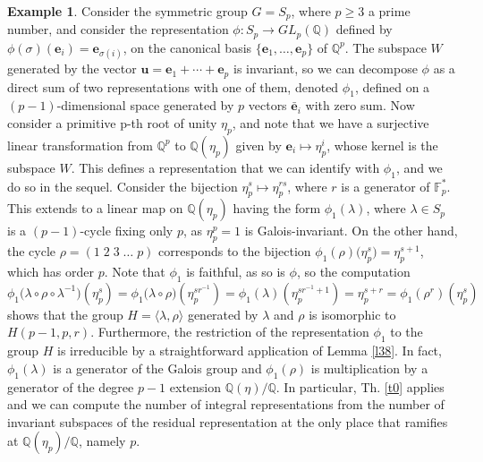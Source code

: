 \documentclass{article}
\theoremstyle{definition}
\newtheorem{ex}[prop]{Example}
\begin{document}
\begin{ex}\label{ex55}
    Consider the symmetric group $G=S_p$, where $p\geq3$ a prime number, 
    and consider the representation $\phi:S_p\rightarrow GL_p(\mathbb{Q})$
    defined by $\phi(\sigma)(\mathbf{e}_i)=\mathbf{e}_{\sigma(i)}$, on 
    the canonical basis $\{\mathbf{e}_1,\dots,\mathbf{e}_p\}$ of 
    $\mathbb{Q}^p$. The subspace $W$ generated by the vector 
    $\mathbf{u}=\mathbf{e}_1+\cdots +\mathbf{e}_p$ is invariant, so we can 
    decompose $\phi$ as a direct sum of two representations with one of them, 
    denoted $\phi_1$, defined on a $(p-1)$-dimensional space generated by $p$
    vectors $\bar{\mathbf{e}}_i$ with zero sum.  Now consider a primitive p-th root of
    unity $\eta_p$, and note that we have a surjective linear transformation 
    from $\mathbb{Q}^{p}$ to $\mathbb{Q}(\eta_p)$ given by 
    $\mathbf{e}_i\mapsto \eta_p^{i}$, whose kernel is the subspace $W$. This 
    defines a representation that we can 
    identify with $\phi_1$, and we do so in the sequel.  Consider the 
    bijection $\eta_p^{s}\mapsto\eta_p^{rs}$, where $r$ is a 
    generator of $\mathbb{F}_p^*$. This extends to a linear map on 
    $\mathbb{Q}(\eta_p)$ having the form $\phi_1(\lambda)$, 
    where $\lambda\in S_p$ is a $(p-1)$-cycle fixing only $p$, as 
    $\eta_p^{p}=1$ is Galois-invariant. On the other hand, the cycle 
    $\rho=(1\;2\;3\;\dots\;p)$ 
    corresponds to the bijection 
    $\phi_1(\rho)\big(\eta_p^{s}\big)=\eta_p^{s+1}$, which has order $p$.
    Note that $\phi_1$ is faithful, as so is $\phi$, so the computation
    $$\phi_1\big(\lambda\circ\rho\circ\lambda^{-1}\big)
    \left(\eta_p^{s}\right)
    =\phi_1\big(\lambda\circ\rho\big)\left(\eta_p^{sr^{-1}}\right)
    =\phi_1(\lambda)\left(\eta_p^{sr^{-1}+1}\right)
    =\eta_p^{s+r}=\phi_1\left(\rho^{r}\right)(\eta_p^s)$$ 
    shows that the group $H=\langle \lambda,\rho\rangle$ generated by 
    $\lambda$ and $\rho$ is isomorphic to $H(p-1,p,r)$. Furthermore, the 
    restriction of the representation $\phi_1$ to the group 
    $H$ is irreducible by a straightforward application 
    of Lemma \ref{l38}. In fact,
    $\phi_1(\lambda)$ is a generator of the Galois group and $\phi_1(\rho)$
    is multiplication by a generator of the degree $p-1$ extension
    $\mathbb{Q}(\eta)/\mathbb{Q}$. In particular, Th. \ref{t0} applies
    and we can compute the number of integral representations from the 
    number of invariant subspaces of the residual representation 
    at the only
    place that ramifies at $\mathbb{Q}(\eta_p)/\mathbb{Q}$, namely $p$. 


\end{ex}
\end{document}

